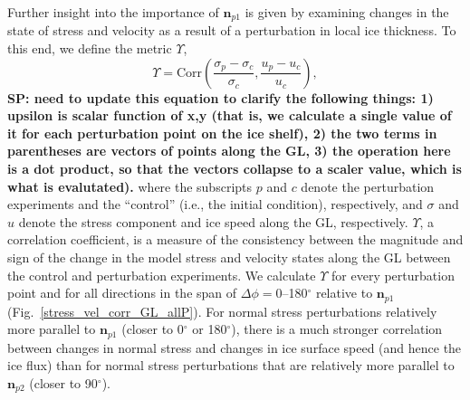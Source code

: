 \documentclass[tc, manuscript]{copernicus}
\begin{document}
Further insight into the importance of $\mathbf{n}_{p1}$ is given by examining changes in the state of stress and velocity as a result of a perturbation in local ice thickness. To this end, we define the metric $\Upsilon$,  
\begin{equation}
    \Upsilon= \textrm{Corr}\left(\frac{\sigma_{p}-\sigma_{c}}{\sigma_{c}}, \frac{u_{p}-u_{c}}{u_{c}}\right),
\label{upsilon}
\end{equation}
\textbf{SP: need to update this equation to clarify the following things: 1) upsilon is scalar function of x,y (that is, we calculate a single value of it for each perturbation point on the ice shelf), 2) the two terms in parentheses are vectors of points along the GL, 3) the operation here is a dot product, so that the vectors collapse to a scaler value, which is what is evalutated).}
where the subscripts $p$ and $c$ denote the perturbation experiments and the ``control'' (i.e., the initial condition), respectively, and $\sigma$ and $u$ denote the stress component and ice speed along the GL, respectively. $\Upsilon$, a correlation coefficient, is a measure of the consistency between the magnitude and sign of the change in the model stress and velocity states along the GL between the control and perturbation experiments. We calculate $\Upsilon$ for every perturbation point and for all directions in the span of $\Delta\phi=$0--180$^\circ$ relative to $\mathbf{n}_{p1}$ (Fig.~\ref{stress_vel_corr_GL_allP}). For normal stress perturbations relatively more parallel to $\mathbf{n}_{p1}$ (closer to 0$^\circ$ or 180$^\circ$), there is a much stronger correlation between changes in normal stress and changes in ice surface speed (and hence the ice flux) than for normal stress perturbations that are relatively more parallel to $\mathbf{n}_{p2}$ (closer to 90$^\circ$).  
\end{document}
